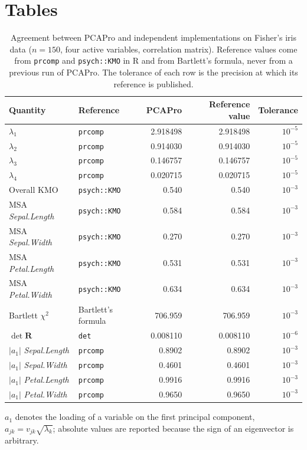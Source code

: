 \documentclass[12pt]{article}
\begin{document}


\clearpage
\section*{Tables}

\begin{table}[htbp]
\centering
\caption{Agreement between PCAPro and independent implementations on Fisher's
iris data ($n = 150$, four active variables, correlation matrix). Reference
values come from \texttt{prcomp} and \texttt{psych::KMO} in R and from
Bartlett's formula, never from a previous run of PCAPro. The tolerance of each
row is the precision at which its reference is published.}
\label{tab:agreement}
\begin{tabular}{llrrr}
\hline
Quantity & Reference & PCAPro & Reference value & Tolerance \\
\hline
$\lambda_1$                  & \texttt{prcomp}     & 2.918498 & 2.918498 & $10^{-5}$ \\
$\lambda_2$                  & \texttt{prcomp}     & 0.914030 & 0.914030 & $10^{-5}$ \\
$\lambda_3$                  & \texttt{prcomp}     & 0.146757 & 0.146757 & $10^{-5}$ \\
$\lambda_4$                  & \texttt{prcomp}     & 0.020715 & 0.020715 & $10^{-5}$ \\
Overall KMO                  & \texttt{psych::KMO} & 0.540    & 0.540    & $10^{-3}$ \\
MSA \emph{Sepal.Length}      & \texttt{psych::KMO} & 0.584    & 0.584    & $10^{-3}$ \\
MSA \emph{Sepal.Width}       & \texttt{psych::KMO} & 0.270    & 0.270    & $10^{-3}$ \\
MSA \emph{Petal.Length}      & \texttt{psych::KMO} & 0.531    & 0.531    & $10^{-3}$ \\
MSA \emph{Petal.Width}       & \texttt{psych::KMO} & 0.634    & 0.634    & $10^{-3}$ \\
Bartlett $\chi^2$            & Bartlett's formula  & 706.959  & 706.959  & $10^{-3}$ \\
$\det \mathbf{R}$            & \texttt{det}        & 0.008110 & 0.008110 & $10^{-6}$ \\
$|a_{1}|$ \emph{Sepal.Length}& \texttt{prcomp}     & 0.8902   & 0.8902   & $10^{-3}$ \\
$|a_{1}|$ \emph{Sepal.Width} & \texttt{prcomp}     & 0.4601   & 0.4601   & $10^{-3}$ \\
$|a_{1}|$ \emph{Petal.Length}& \texttt{prcomp}     & 0.9916   & 0.9916   & $10^{-3}$ \\
$|a_{1}|$ \emph{Petal.Width} & \texttt{prcomp}     & 0.9650   & 0.9650   & $10^{-3}$ \\
\hline
\end{tabular}

\vspace{0.5em}
\begin{minipage}{\textwidth}
\footnotesize $a_{1}$ denotes the loading of a variable on the first principal
component, $a_{jk} = v_{jk}\sqrt{\lambda_k}$; absolute values are reported
because the sign of an eigenvector is arbitrary.
\end{minipage}
\end{table}
\end{document}
